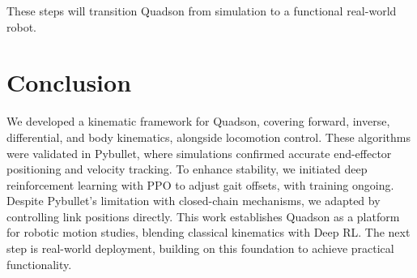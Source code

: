 \documentclass[a4paper,11pt]{article}
\begin{document}
These steps will transition Quadson from simulation to a functional real-world robot.

\section{Conclusion}

We developed a kinematic framework for Quadson, covering forward, inverse, differential, and body kinematics, alongside locomotion control. These algorithms were validated in Pybullet, where simulations confirmed accurate end-effector positioning and velocity tracking. 
To enhance stability, we initiated deep reinforcement learning with PPO to adjust gait offsets, with training ongoing. Despite Pybullet's limitation with closed-chain mechanisms, we adapted by controlling link positions directly. This work establishes Quadson as a platform for robotic motion studies, 
blending classical kinematics with Deep RL. The next step is real-world deployment, building on this foundation to achieve practical functionality.
\end{document}
